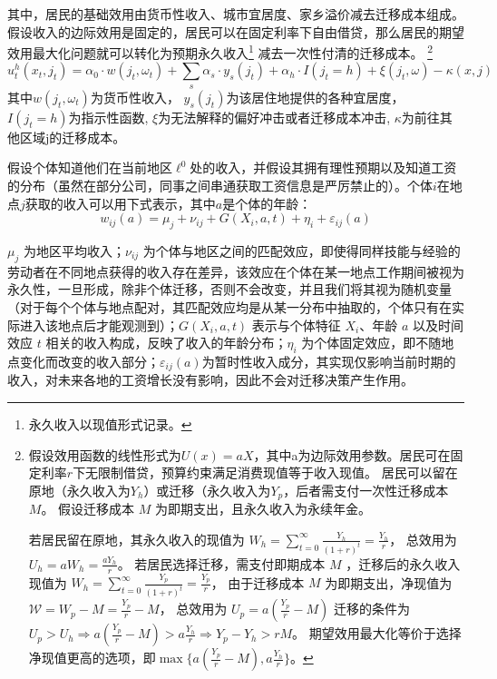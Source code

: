 \documentclass[a4paper,12pt,oneside]{book} %
\begin{document}
其中，居民的基础效用由货币性收入、城市宜居度、家乡溢价减去迁移成本组成。假设收入的边际效用是固定的，居民可以在固定利率下自由借贷，那么居民的期望效用最大化问题就可以转化为预期永久收入\footnote{永久收入以现值形式记录。}
减去一次性付清的迁移成本。
\footnote{
假设效用函数的线性形式为$U(x)=a X$，其中a为边际效用参数。居民可在固定利率$r$下无限制借贷，预算约束满足消费现值等于收入现值。
居民可以留在原地（永久收入为$Y_h$）或迁移（永久收入为$Y_p$，后者需支付一次性迁移成本 $M$。
假设迁移成本 
$M$
为即期支出，且永久收入为永续年金。

若居民留在原地，其永久收入的现值为
$W_h = \sum\limits_{t=0}^\infty \frac{Y_h}{(1+r)^t}=\frac{Y_h}{r}$，
总效用为$U_h=a W_h = \frac{a Y_h}{r}$。
若居民选择迁移，需支付即期成本 
$M$
，迁移后的永久收入现值为
$W_h = \sum\limits_{t=0}^\infty \frac{Y_p}{(1+r)^t}=\frac{Y_p}{r}$，
由于迁移成本 
$M$
为即期支出，净现值为
$\mathcal{W}=W_p-M=\frac{Y_p}{r}-M$，
总效用为
$U_p=a(\frac{Y_p}{r}-M)$
迁移的条件为$U_p>U_h \Rightarrow a(\frac{Y_p}{r}-M) > a \frac{ Y_h}{r} \Rightarrow Y_p-Y_h > rM$。
期望效用最大化等价于选择净现值更高的选项，即$\max\{a(\frac{Y_p}{r}-M), a \frac{ Y_h}{r}\}$。
}
\begin{equation}
  u_t^h(x_t,j_t)=\alpha_0 \cdot w(j_t,\omega_t)+\sum\limits_{s} \alpha_{s} \cdot y_{s}(j_t)+\alpha_h \cdot I(j_t=h)+\xi(j_t,\omega)-\kappa(x,j)
\end{equation}
其中$w(j_t,\omega_t)$为货币性收入，
$y_{s}(j_t)$为该居住地提供的各种宜居度，
$I(j_t=h)$为指示性函数,
$\xi$为无法解释的偏好冲击或者迁移成本冲击,
$\kappa$为前往其他区域j的迁移成本。



假设个体知道他们在当前地区$\ell^0$处的收入，并假设其拥有理性预期以及知道工资的分布（虽然在部分公司，同事之间串通获取工资信息是严厉禁止的）。个体$i$在地点$j$获取的收入可以用下式表示，其中$a$是个体的年龄：
\begin{equation}
  w_{ij}(a)=\mu_j+\nu_{ij}+G(X_i,a,t)+\eta_i+\varepsilon_{ij}(a)
\end{equation}

$\mu_j$ 为地区平均收入；$\nu_{ij}$ 为个体与地区之间的匹配效应，即使得同样技能与经验的劳动者在不同地点获得的收入存在差异，该效应在个体在某一地点工作期间被视为永久性，一旦形成，除非个体迁移，否则不会改变，并且我们将其视为随机变量（对于每个个体与地点配对，其匹配效应均是从某一分布中抽取的，个体只有在实际进入该地点后才能观测到）；$G(X_i,a,t)$ 表示与个体特征 $X_i$、年龄 $a$ 以及时间效应 $t$ 相关的收入构成，反映了收入的年龄分布；$\eta_i$ 为个体固定效应，即不随地点变化而改变的收入部分；$\varepsilon_{ij}(a)$为暂时性收入成分，其实现仅影响当前时期的收入，对未来各地的工资增长没有影响，因此不会对迁移决策产生作用。
\end{document}
